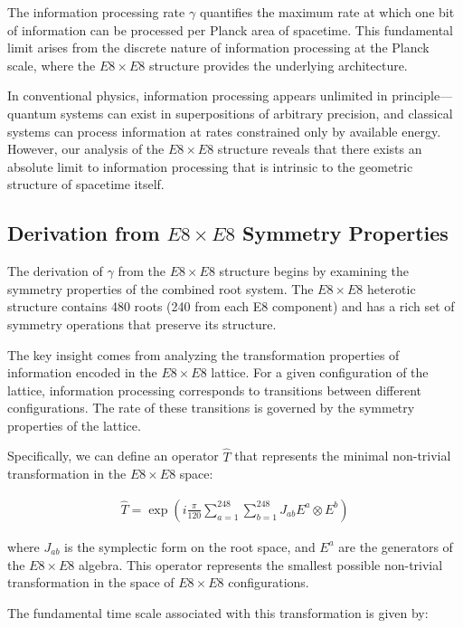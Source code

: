 \documentclass[11pt,english,twoside]{article}
\begin{document}
The information processing rate $\gamma$ quantifies the maximum rate at which one bit of information can be processed per Planck area of spacetime. This fundamental limit arises from the discrete nature of information processing at the Planck scale, where the $E8\times E8$ structure provides the underlying architecture.

In conventional physics, information processing appears unlimited in principle---quantum systems can exist in superpositions of arbitrary precision, and classical systems can process information at rates constrained only by available energy. However, our analysis of the $E8\times E8$ structure reveals that there exists an absolute limit to information processing that is intrinsic to the geometric structure of spacetime itself.

\subsection{Derivation from $E8\times E8$ Symmetry Properties}

The derivation of $\gamma$ from the $E8\times E8$ structure begins by examining the symmetry properties of the combined root system. The $E8\times E8$ heterotic structure contains 480 roots (240 from each E8 component) and has a rich set of symmetry operations that preserve its structure.

The key insight comes from analyzing the transformation properties of information encoded in the $E8\times E8$ lattice. For a given configuration of the lattice, information processing corresponds to transitions between different configurations. The rate of these transitions is governed by the symmetry properties of the lattice.

Specifically, we can define an operator $\hat{T}$ that represents the minimal non-trivial transformation in the $E8\times E8$ space:

\begin{align}
    \hat{T} = \exp\left(i\frac{\pi}{120}\sum_{a=1}^{248}\sum_{b=1}^{248} J_{ab} E^a \otimes E^b\right)
\end{align}

where $J_{ab}$ is the symplectic form on the root space, and $E^a$ are the generators of the $E8\times E8$ algebra. This operator represents the smallest possible non-trivial transformation in the space of $E8\times E8$ configurations.

The fundamental time scale associated with this transformation is given by:
\end{document}
